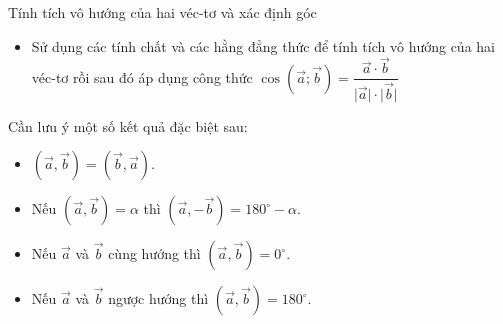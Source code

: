 \begin{dang}{Tính tích vô hướng của hai véc-tơ và xác định góc}
\begin{itemize}
		\item Sử dụng các tính chất và các hằng đẳng thức để tính tích vô hướng của hai véc-tơ rồi sau đó áp dụng công thức $ \cos \left (\overrightarrow{a};\overrightarrow{b}\right )=\dfrac{\overrightarrow{a}\cdot \overrightarrow{b}}{\big|\overrightarrow{a}\big|\cdot \big|\overrightarrow{b}\big|} $
	\end{itemize}
	Cần lưu ý một số kết quả đặc biệt sau:
	\begin{itemize}
		\item $\left (\overrightarrow{a},\overrightarrow{b}\right )=\left (\overrightarrow{b},\overrightarrow{a}\right )$.
		\item Nếu $ \left(\overrightarrow{a},\overrightarrow{b} \right) =\alpha $ thì $ \left(\overrightarrow{a},-\overrightarrow{b} \right) =180^\circ -\alpha $.
		\item Nếu $\overrightarrow{a}$ và $\overrightarrow{b}$ cùng hướng thì $\left (\overrightarrow{a},\overrightarrow{b}\right )=0^{\circ}$.
		\item Nếu $\overrightarrow{a}$ và $\overrightarrow{b}$ ngược hướng thì $\left (\overrightarrow{a},\overrightarrow{b}\right )=180^{\circ}$.
	\end{itemize}
\end{dang}
\viduminhhoa
